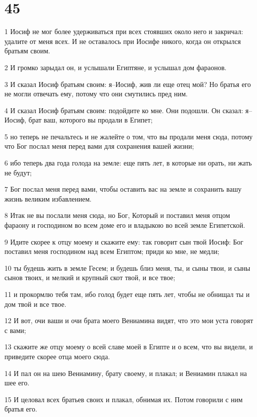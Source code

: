\chapter{45}

\par 1 Иосиф не мог более удерживаться при всех стоявших около него и закричал: удалите от меня всех. И не оставалось при Иосифе никого, когда он открылся братьям своим.
\par 2 И громко зарыдал он, и услышали Египтяне, и услышал дом фараонов.
\par 3 И сказал Иосиф братьям своим: я--Иосиф, жив ли еще отец мой? Но братья его не могли отвечать ему, потому что они смутились пред ним.
\par 4 И сказал Иосиф братьям своим: подойдите ко мне. Они подошли. Он сказал: я--Иосиф, брат ваш, которого вы продали в Египет;
\par 5 но теперь не печальтесь и не жалейте о том, что вы продали меня сюда, потому что Бог послал меня перед вами для сохранения вашей жизни;
\par 6 ибо теперь два года голода на земле: еще пять лет, в которые ни орать, ни жать не будут;
\par 7 Бог послал меня перед вами, чтобы оставить вас на земле и сохранить вашу жизнь великим избавлением.
\par 8 Итак не вы послали меня сюда, но Бог, Который и поставил меня отцом фараону и господином во всем доме его и владыкою во всей земле Египетской.
\par 9 Идите скорее к отцу моему и скажите ему: так говорит сын твой Иосиф: Бог поставил меня господином над всем Египтом; приди ко мне, не медли;
\par 10 ты будешь жить в земле Гесем; и будешь близ меня, ты, и сыны твои, и сыны сынов твоих, и мелкий и крупный скот твой, и все твое;
\par 11 и прокормлю тебя там, ибо голод будет еще пять лет, чтобы не обнищал ты и дом твой и все твое.
\par 12 И вот, очи ваши и очи брата моего Вениамина видят, что это мои уста говорят с вами;
\par 13 скажите же отцу моему о всей славе моей в Египте и о всем, что вы видели, и приведите скорее отца моего сюда.
\par 14 И пал он на шею Вениамину, брату своему, и плакал; и Вениамин плакал на шее его.
\par 15 И целовал всех братьев своих и плакал, обнимая их. Потом говорили с ним братья его.
